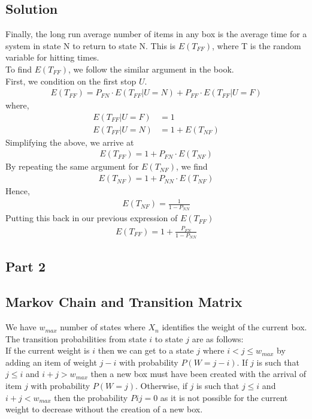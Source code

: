 \documentclass[10pt,a4paper]{article}
\begin{document}
\subsection*{Solution}
Finally, the long run average number of items in any box is the average time for a system in state N to return to state N. This is $ E(T_{FF}) $, where T is the random variable for hitting times. \\
To find $ E(T_{FF}) $, we follow the similar argument in the book. \\
First, we condition on the first stop $ U $. 
\begin{align*}
E(T_{FF}) = P_{FN}\cdot E(T_{FF}|U=N)+P_{FF}\cdot E(T_{FF}|U=F)
\end{align*}
where,\\
\begin{align*}
E(T_{FF}|U=F) &= 1 \\
E(T_{FF}|U=N) &= 1+E(T_{NF})
\end{align*}
Simplifying the above, we arrive at\\
\begin{align*}
E(T_{FF}) = 1+ P_{FN}\cdot E(T_{NF})
\end{align*}
By repeating the same argument for $ E(T_{NF}) $, we find \\
\begin{align*}
E(T_{NF}) = 1+ P_{NN}\cdot E(T_{NF})
\end{align*}
Hence, 
\begin{align*}
E(T_{NF}) = \frac{1}{1 - P_{NN}}
\end{align*}
Putting this back in our previous expression of $ E(T_{FF}) $
\begin{align*}
E(T_{FF}) = 1+ \frac{P_{FN}}{1 - P_{NN}}
\end{align*}


\subsection{Part 2}
\subsection*{Markov Chain and Transition Matrix}
We have $w_{max}$ number of states where $X_n$ identifies the weight of the current box.\\
The transition probabilities from state $i$ to state $j$ are as follows:\\
If the current weight is $i$ then we can get to a state $j$ where $i < j \leq w_{max}$ by adding an item of weight $j-i$ with probability $P(W=j-i)$. If $j$ is such that $j \leq i$ and $i+j>w_{max}$ then a new box must have been created with the arrival of item $j$ with probability $P(W=j)$. Otherwise, if $j$ is such that $j \leq i$ and $i+j<w_{max}$ then the probability $Pij=0$ as it is not possible for the current weight to decrease without the creation of a new box.\\
\end{document}

